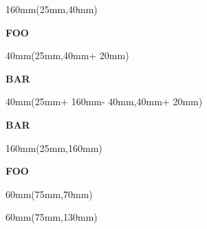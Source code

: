 \documentclass[a4paper,draft]{article}
\newcommand\StartX{25mm} \newcommand\StartY{40mm}
\newcommand\Wi{160mm} \newcommand\Wii{40mm} \newcommand\Wiii{60mm}
\newcommand\Hi{20mm}  \newcommand\Hii{100mm}
\begin{document}
\textblockorigin{0cm}{0cm}

\begin{textblock*}{\Wi}(\StartX,\StartY)%
  \noindent\colorbox[rgb]{0,0,1}{%
    \begin{minipage}[c][\Hi - 2\fboxsep][c]{\linewidth - 2\fboxsep}%
      \centering\Huge\textbf{FOO}%
    \end{minipage}}%
\end{textblock*}

\begin{textblock*}{\Wii}(\StartX,\StartY + 20mm)%
  \noindent\colorbox[rgb]{0,1,0}{%
    \begin{minipage}[c][\Hii - 2\fboxsep][c]{\linewidth - 2\fboxsep}%
      \centering\Huge\textbf{BAR}%
    \end{minipage}}%
\end{textblock*}

\begin{textblock*}{\Wii}(\StartX + \Wi - \Wii,\StartY + 20mm)%
  \noindent\colorbox[rgb]{1,1,0}{%
    \begin{minipage}[c][\Hii - 2\fboxsep][c]{\linewidth - 2\fboxsep}%
      \centering\Huge\textbf{BAR}%
    \end{minipage}}%
\end{textblock*}

\begin{textblock*}{\Wi}(\StartX,\Wi)%
  \noindent\colorbox[rgb]{1,0,1}{%
    \begin{minipage}[c][\Hi - 2\fboxsep][c]{\linewidth - 2\fboxsep}%
      \centering\Huge\textbf{FOO}%
    \end{minipage}}%
\end{textblock*}

\begin{textblock*}{\Wiii}(75mm,70mm)%
  \setlength\fboxrule{2pt}%
  \noindent{}%
\end{textblock*}

\begin{textblock*}{\Wiii}(75mm,130mm)%
  \setlength\fboxrule{2pt}%
  \noindent\fbox{%
    \begin{minipage}[c][\Hi - 2\fboxsep - 2\fboxrule]%
      {\linewidth - 2\fboxsep - 2\fboxrule}%
      \centering\Huge\textbf{\LaTeX}   
    \end{minipage}}%
\end{textblock*}
\end{document}
